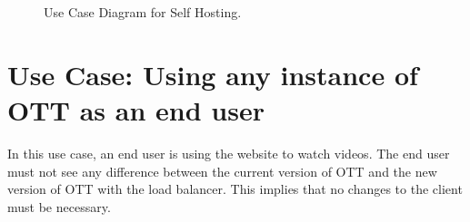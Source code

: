 \begin{figure}[!htb]
  \centering
  \caption{\label{Figure::gossip-class-diaguse-case-self-host} Use Case Diagram for Self Hosting.}
\end{figure}


\section{Use Case: Using any instance of OTT as an end user}

In this use case, an end user is using the website to watch videos. The end user must not see any difference between the current version of OTT and the new version of OTT with the load balancer. This implies that no changes to the client must be necessary.
